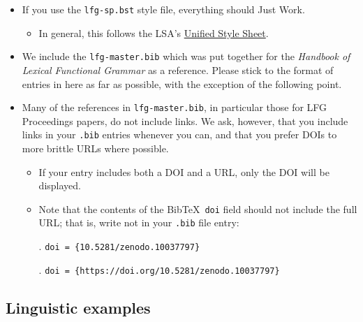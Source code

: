 \documentclass[linguex]{lfg-proc}
\newcommand{\goodex}{\makebox[0pt][r]{\normalfont\ding{51}\ignorespaces}}
\newcommand{\badex}{\makebox[0pt][r]{\normalfont\ding{55}\ignorespaces}}
\begin{document}
\begin{itemize}
  \item If you use the \verb=lfg-sp.bst= style file, everything should Just
        Work.
        \begin{itemize}
          \item In general, this follows the LSA's
                \href{https://www.linguisticsociety.org/resource/unified-style-sheet}{Unified
                Style Sheet}.
            \end{itemize}

  \item We include the \verb=lfg-master.bib= which was put together for the
        \textit{Handbook of Lexical Functional Grammar} \citep{lfg-handbook} as
        a reference. Please stick to the format of entries in here as far as
        possible, with the exception of the following point.

  \item Many of the references in \verb=lfg-master.bib=, in particular those for
        LFG Proceedings papers, do not include links. We ask, however, that you
        include links in your \verb=.bib= entries whenever you can, and that you
        prefer DOIs to more brittle URLs where possible.
        \begin{itemize}
          \item If your entry includes both a DOI and a URL, only the DOI will
                be displayed.
          \item Note that the contents of the Bib\TeX\ \verb=doi= field should not
                include the full URL; that is, write \Next not \NNext in your
                \verb=.bib= file entry:

                \ex. \goodex\texttt{doi = \{10.5281/zenodo.10037797\}}

                \ex. \badex\texttt{doi = \{https://doi.org/10.5281/zenodo.10037797\}}

        \end{itemize}
\end{itemize}

\subsection{Linguistic examples}
\end{document}
